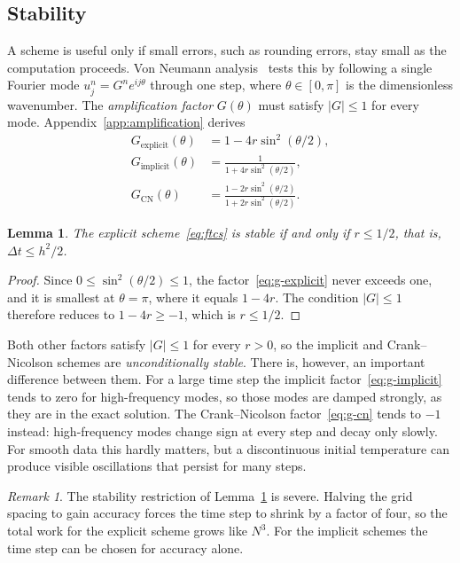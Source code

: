 \documentclass[11pt]{article}
\newtheorem{lemma}[theorem]{Lemma}
\theoremstyle{definition}
\theoremstyle{remark}
\newtheorem{remark}[theorem]{Remark}
\begin{document}
\subsection{Stability}\label{sec:stability}

A scheme is useful only if small errors, such as rounding errors, stay small as the computation proceeds. Von Neumann analysis~\cite{morton2005, strikwerda2004} tests this by following a single Fourier mode $u_j^n = G^n e^{i j \theta}$ through one step, where $\theta \in [0, \pi]$ is the dimensionless wavenumber. The \emph{amplification factor} $G(\theta)$ must satisfy $|G| \le 1$ for every mode. Appendix~\ref{app:amplification} derives
\begin{align}
  G_{\text{explicit}}(\theta) &= 1 - 4 r \sin^2(\theta/2), \label{eq:g-explicit} \\
  G_{\text{implicit}}(\theta) &= \frac{1}{1 + 4 r \sin^2(\theta/2)}, \label{eq:g-implicit} \\
  G_{\text{CN}}(\theta) &= \frac{1 - 2 r \sin^2(\theta/2)}{1 + 2 r \sin^2(\theta/2)} . \label{eq:g-cn}
\end{align}

\begin{lemma}\label{lem:explicit-stability}
The explicit scheme~\eqref{eq:ftcs} is stable if and only if $r \le 1/2$, that is, $\Delta t \le h^2 / 2$.
\end{lemma}

\begin{proof}
Since $0 \le \sin^2(\theta/2) \le 1$, the factor~\eqref{eq:g-explicit} never exceeds one, and it is smallest at $\theta = \pi$, where it equals $1 - 4r$. The condition $|G| \le 1$ therefore reduces to $1 - 4r \ge -1$, which is $r \le 1/2$.
\end{proof}

Both other factors satisfy $|G| \le 1$ for every $r > 0$, so the implicit and Crank--Nicolson schemes are \emph{unconditionally stable}. There is, however, an important difference between them. For a large time step the implicit factor~\eqref{eq:g-implicit} tends to zero for high-frequency modes, so those modes are damped strongly, as they are in the exact solution. The Crank--Nicolson factor~\eqref{eq:g-cn} tends to $-1$ instead: high-frequency modes change sign at every step and decay only slowly. For smooth data this hardly matters, but a discontinuous initial temperature can produce visible oscillations that persist for many steps.

\begin{remark}
The stability restriction of Lemma~\ref{lem:explicit-stability} is severe. Halving the grid spacing to gain accuracy forces the time step to shrink by a factor of four, so the total work for the explicit scheme grows like $N^3$. For the implicit schemes the time step can be chosen for accuracy alone.
\end{remark}
\end{document}
